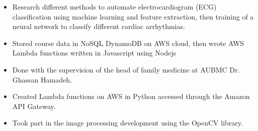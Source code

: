 \documentclass[10pt,a4paper]{altacv}
\begin{document}
\divider

\begin{itemize}
\item Research different methods to automate electrocardiogram  (ECG) classification using machine learning and feature extraction, then training of a neural network to classify different cardiac arrhythmias.\\
\end{itemize}


\begin{itemize}
    \item Stored course data in NoSQL DynamoDB on AWS cloud, then wrote AWS Lambda functions written in Javascript using Nodejs\\
\end{itemize}
\divider

\begin{itemize}
    \item Done with the supervision of the head of family medicine at AUBMC Dr. Ghassan Hamadeh.
    \item Created Lambda functions on AWS in Python accessed through the Amazon API Gateway.
    \item Took part in the image processing development using the OpenCV library.\\

\end{itemize}
\end{document}
